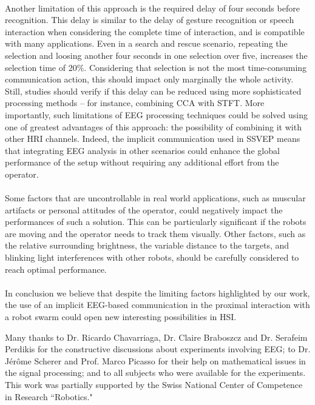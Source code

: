 \documentclass[smallextended]{svjour3}
\begin{document}
\\
Another limitation of this approach is the required delay of four seconds before recognition.
This delay is similar to the delay of gesture recognition or speech interaction when considering the complete time of interaction, and is compatible with many applications. Even in a search and rescue scenario, repeating the selection and loosing another four seconds in one selection over five, increases the selection time of 20\%. Considering that selection is not the most time-consuming communication action, this should impact only marginally the whole activity. Still, studies should verify if this delay can be reduced using more sophisticated processing methods -- for instance, combining CCA with STFT.
More importantly, such limitations of EEG processing techniques could be solved using one of greatest advantages of this approach: the possibility of combining it with other HRI channels.
Indeed, the implicit communication used in SSVEP means that integrating EEG analysis in other scenarios could enhance the global performance of the setup without requiring any additional effort from the operator.\\
\\
Some factors that are uncontrollable in real world applications, such as muscular artifacts or personal attitudes of the operator, could negatively impact the performances of such a solution.
This can be particularly significant if the robots are moving and the operator needs to track them visually. 
Other factors, such as the relative surrounding brightness, the variable distance to the targets, and blinking light interferences with other robots, should be carefully considered to reach optimal performance. \\
\\
In conclusion we believe that despite the limiting factors highlighted by our work, the use of an implicit EEG-based communication in the proximal interaction with a robot swarm could open new interesting possibilities in HSI.\\




\begin{acknowledgement}
Many thanks to Dr. Ricardo Chavarriaga, Dr. Claire Braboszcz and Dr. Serafeim Perdikis for the constructive discussions about experiments involving EEG; to Dr. J\'er\^ome Scherer and Prof. Marco Picasso for their help on mathematical issues in the signal processing; and to all subjects who were available for the experiments. This work was partially supported by the Swiss National Center of Competence in Research ``Robotics."
\end{acknowledgement}


\end{document}
